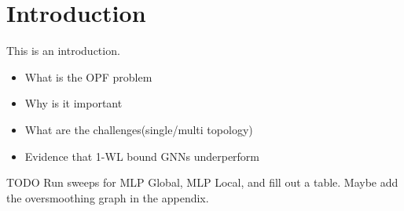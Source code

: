 \section*{Introduction}

This is an introduction.

\begin{itemize}
    \item What is the OPF problem
    \item Why is it important
    \item What are the challenges(single/multi topology)
    \item Evidence that 1-WL bound GNNs underperform
\end{itemize}

TODO Run sweeps for MLP Global, MLP Local, and fill out a table. Maybe add the oversmoothing graph in the appendix.